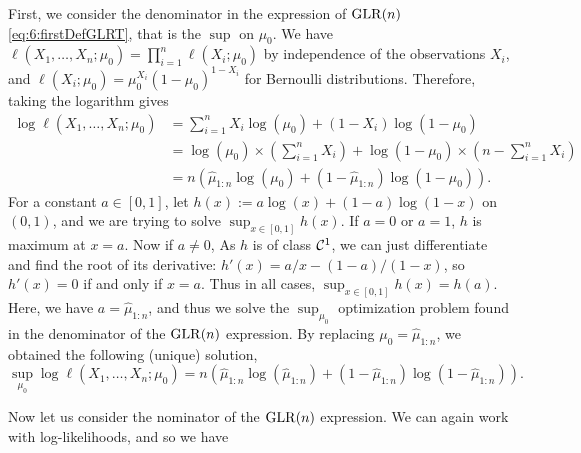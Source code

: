 \begin{smallproof}
    First, we consider the denominator in the expression of $\mathrm{GLR}(n)$ \eqref{eq:6:firstDefGLRT}, that is the $\sup$ on $\mu_0$.
    We have $\ell(X_1, \ldots, X_n ; \mu_0) = \prod_{i=1}^n \ell(X_i ; \mu_0)$ by independence of the observations $X_i$,
    and $\ell(X_i ; \mu_0) = \mu_0^{X_i} (1-\mu_0)^{1-X_i}$ for Bernoulli distributions.
    Therefore, taking the logarithm gives
    \begin{align*}
        \log\ell(X_1, \ldots, X_n ; \mu_0)
        &= \sum_{i=1}^n X_i \log(\mu_0) + (1-X_i) \log(1-\mu_0) \\
        &= \log(\mu_0) \times \left( \sum_{i=1}^n X_i \right) + \log(1-\mu_0) \times \left( n - \sum_{i=1}^n X_i \right) \\
        &= n \left( \widehat{\mu}_{1:n} \log(\mu_0) + (1 - \widehat{\mu}_{1:n}) \log(1-\mu_0) \right).
    \end{align*}
    For a constant $a\in[0,1]$, let $h(x) := a \log(x) + (1-a) \log(1-x)$ on $(0,1)$,
    and we are trying to solve $\sup_{x\in[0,1]} h(x)$.
    If $a=0$ or $a=1$, $h$ is maximum at $x=a$.
    Now if $a\neq0$, As $h$ is of class $\mathcal{C}^1$, we can just differentiate and find the root of its derivative:
    $h'(x) = a/x - (1-a)/(1-x)$, so $h'(x) = 0$ if and only if $x=a$.
    Thus in all cases, $\sup_{x\in[0,1]} h(x) = h(a)$.
    Here, we have $a = \widehat{\mu}_{1:n}$, and thus we solve the $\sup_{\mu_0}$ optimization problem found in the denominator of the $\mathrm{GLR}(n)$ expression.
    By replacing $\mu_0 = \widehat{\mu}_{1:n}$, we obtained the following (unique) solution,
    \begin{equation}\label{eq:6:solutionPbOpt_for_1n}
        \sup_{\mu_0} \log\ell(X_1, \ldots, X_n ; \mu_0) = n \left( \widehat{\mu}_{1:n} \log(\widehat{\mu}_{1:n}) + (1 - \widehat{\mu}_{1:n}) \log(1-\widehat{\mu}_{1:n}) \right).
    \end{equation}

    Now let us consider the nominator of the $\mathrm{GLR}(n)$ expression.
    We can again work with log-likelihoods, and so we have


\end{smallproof}
